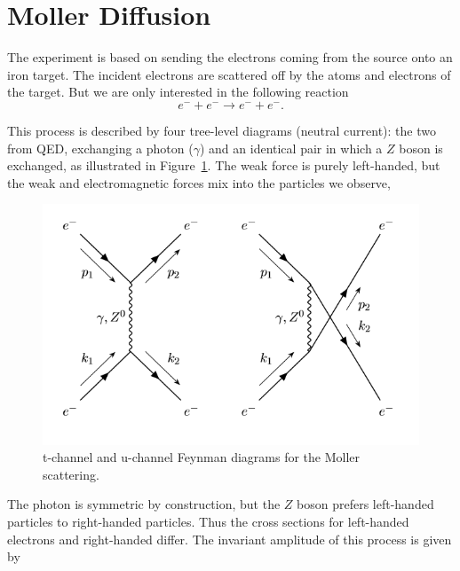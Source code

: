 \documentclass[10pt,swedish, openany]{book}
\begin{document}
\section{Moller Diffusion}

The experiment is based on sending the electrons coming from the source onto an iron target. The incident electrons are scattered off by the atoms and electrons of the target. But we are only interested in the following reaction
\begin{equation}
    e^- + e^- \rightarrow e^- + e^-.
\end{equation}

This process is described by four tree-level diagrams (neutral current): the two from QED, exchanging a photon ($\gamma$) and an identical pair in which a $Z$ boson is exchanged, as illustrated in Figure~\ref{fig:MollerScattering}. The weak force is purely left-handed, but the weak and electromagnetic forces mix into the particles we observe, 

\begin{figure}[h]
\includegraphics[scale=0.5]{moller.png}
\centering
\caption{t-channel and u-channel Feynman diagrams for the Moller scattering.}
\label{fig:MollerScattering}
\end{figure}

The photon is symmetric by construction, but the $Z$ boson prefers left-handed particles to right-handed particles. Thus the cross sections for left-handed electrons and right-handed differ.  The invariant amplitude of this process is given by
\end{document}
